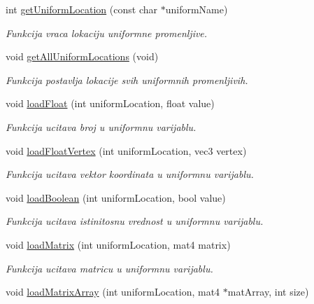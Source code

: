 \begin{DoxyCompactItemize}
int \hyperlink{classshader_1_1AnimatedModelShader_a4977309c28777e27a5d3f617336e4010}{get\+Uniform\+Location} (const char $\ast$uniform\+Name)
\begin{DoxyCompactList}\small\item\em Funkcija vraca lokaciju uniformne promenljive. \end{DoxyCompactList}\item 
void \hyperlink{classshader_1_1AnimatedModelShader_a41de54497f81f6781a11730041b23051}{get\+All\+Uniform\+Locations} (void)
\begin{DoxyCompactList}\small\item\em Funkcija postavlja lokacije svih uniformnih promenljivih. \end{DoxyCompactList}\item 
void \hyperlink{classshader_1_1AnimatedModelShader_aee125607dd4ec4add27abc2f73864c03}{load\+Float} (int uniform\+Location, float value)
\begin{DoxyCompactList}\small\item\em Funkcija ucitava broj u uniformnu varijablu. \end{DoxyCompactList}\item 
void \hyperlink{classshader_1_1AnimatedModelShader_ab96bff27275920f8f57f27212803032d}{load\+Float\+Vertex} (int uniform\+Location, vec3 vertex)
\begin{DoxyCompactList}\small\item\em Funkcija ucitava vektor koordinata u uniformnu varijablu. \end{DoxyCompactList}\item 
void \hyperlink{classshader_1_1AnimatedModelShader_a0ba6b4419f5bfbc3c17077498ebe0451}{load\+Boolean} (int uniform\+Location, bool value)
\begin{DoxyCompactList}\small\item\em Funkcija ucitava istinitosnu vrednost u uniformnu varijablu. \end{DoxyCompactList}\item 
void \hyperlink{classshader_1_1AnimatedModelShader_aeda8117c11b10329c9568be62da95049}{load\+Matrix} (int uniform\+Location, mat4 matrix)
\begin{DoxyCompactList}\small\item\em Funkcija ucitava matricu u uniformnu varijablu. \end{DoxyCompactList}\item 
void \hyperlink{classshader_1_1AnimatedModelShader_ad0cf72a80e1af3c647a9c0e14b834eb0}{load\+Matrix\+Array} (int uniform\+Location, mat4 $\ast$mat\+Array, int size)

\end{DoxyCompactItemize}
